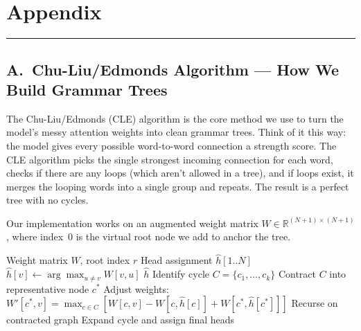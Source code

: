 \documentclass[11pt, a4paper]{article}
\begin{document}
\newpage
\appendix
\section*{\textcolor{primaryblue}{Appendix}}
{\color{primaryblue}\rule{\linewidth}{0.6pt}}
\vspace{4pt}

\subsection*{A.\ Chu-Liu/Edmonds Algorithm --- How We Build Grammar Trees}

The Chu-Liu/Edmonds (CLE) algorithm is the core method we use to turn the model's messy attention weights into clean grammar trees. Think of it this way: the model gives every possible word-to-word connection a strength score. The CLE algorithm picks the single strongest incoming connection for each word, checks if there are any loops (which aren't allowed in a tree), and if loops exist, it merges the looping words into a single group and repeats. The result is a perfect tree with no cycles.

Our implementation works on an augmented weight matrix $W \in \mathbb{R}^{(N+1) \times (N+1)}$, where index~0 is the virtual root node we add to anchor the tree.

\begin{algorithm}[H]
\caption{Chu-Liu/Edmonds Maximum Spanning Arborescence}
\begin{algorithmic}[1]
\Require Weight matrix $W$, root index $r$
\Ensure Head assignment $\hat{h}[1..N]$
    \State $\hat{h}[v] \gets \arg\max_{u \neq v} W[v, u]$ 
\EndFor
{}
    \State \Return $\hat{h}$ 
\EndIf
\State Identify cycle $C = \{c_1, \ldots, c_k\}$ 
\State Contract $C$ into representative node $c^*$ 
\State Adjust weights: $W'[c^*, v] = \max_{c \in C} [W[c, v] - W[c, \hat{h}[c]] + W[c^*, \hat{h}[c^*]]]$
\State Recurse on contracted graph 
\State Expand cycle and assign final heads
\end{algorithmic}
\end{algorithm}

\end{document}
